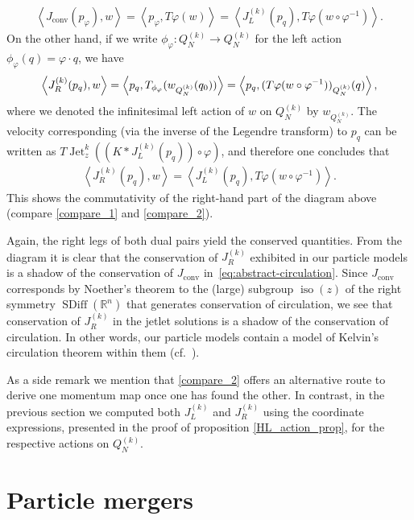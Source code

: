\documentclass[12pt]{amsart}
\newcommand{\R}{\ensuremath{\mathbb{R}}}
\DeclareMathOperator{\SDiff}{SDiff}
\DeclareMathOperator{\Jet}{Jet}
\DeclareMathOperator{\iso}{iso}
\begin{document}
 \begin{align}
 	\left<J_\text{conv}(p_\varphi), w\right> = \left<p_\varphi, T\varphi  (w) \right> = \left<J_L^{(k)}(p_q),  T\varphi (w \circ \varphi^{-1}) \right>. \label{compare_1}
 \end{align}
 On the other hand, if we write $\phi_\varphi: Q^{(k)}_N \to Q^{(k)}_N$ for the left action $\phi_\varphi (q) = \varphi \cdot q$, we have 
 \begin{align}
 	\left<J_R^{(k)}(p_q), w\right> = \left< p_q, T_{\phi_\varphi} (w_{Q^{(k)}_N} (q_0))   \right> =  \left<p_q, (T\varphi (w \circ \varphi^{-1}) )_{Q^{(k)}_N} (q) \right>, \notag \end{align}
 where we denoted the infinitesimal left action of $w$ on $Q^{(k)}_N$ by $w_{Q^{(k)}_N}$. The velocity corresponding (via the inverse of the Legendre transform) to $p_q$ can be written as $ T\Jet_z^k( (K * J_L^{(k)}(p_q)) \circ \varphi)$,
 and therefore one concludes that 
 \begin{align}
 	\left<J_R^{(k)}(p_q), w\right> = \left< J_L^{(k)}(p_q), T \varphi (w \circ \varphi^{-1}) \right>. \label{compare_2}
 \end{align}
 This shows the commutativity of the right-hand part of the  diagram above (compare \eqref{compare_1} and \eqref{compare_2}).
  
  Again, the right legs of both dual pairs yield the conserved quantities.
From the diagram it is clear that the conservation of $J_R^{(k)}$ exhibited in
our particle models is a shadow of the conservation of $J_\text{conv}$ in~\eqref{eq:abstract-circulation}.
Since $J_\text{conv}$ corresponds by Noether's theorem to the (large)
subgroup $\iso(z)$ of the right symmetry $\SDiff(\R^n)$ that generates
conservation of circulation, we see that conservation of $J_R^{(k)}$ in the jetlet solutions is a shadow
of the conservation of circulation.
In other words, our particle models contain a model of Kelvin's circulation theorem within them (cf.~\cite[Theorem 5.5]{JacobsRatiuDesbrun2013}).

As a side remark we mention that \eqref{compare_2} offers an alternative route to derive one momentum map once one has found the other. In contrast,  in the previous section we computed both $J_L^{(k)}$ and $J_R^{(k)}$ using the coordinate expressions, presented in the proof of proposition \ref{HL_action_prop},  for the respective actions on $Q^{(k)}_N$.


\section{Particle mergers}
\label{sec:collisions}
\end{document}
